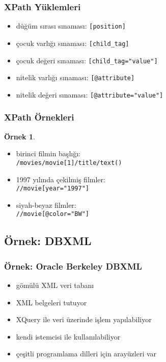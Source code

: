 \documentclass[dvipsnames]{beamer}
\theoremstyle{definition}
\theoremstyle{example}
\newtheorem{ornek}[theorem]{Örnek}
\theoremstyle{plain}
\begin{document}
\begin{frame}
  \frametitle{XPath Yüklemleri}

  \begin{itemize}
    \item düğüm sırası sınaması: \lstinline![position]!

    \pause
    \medskip
    \item çocuk varlığı sınaması: \lstinline![child_tag]!
    \item çocuk değeri sınaması: \lstinline![child_tag="value"]!

    \pause
    \medskip
    \item nitelik varlığı sınaması: \lstinline![@attribute]!
    \item nitelik değeri sınaması: \lstinline![@attribute="value"]!
  \end{itemize}
\end{frame}

\begin{frame}
  \frametitle{XPath Örnekleri}

  \begin{ornek}
    \begin{itemize}
      \item birinci filmin başlığı:\\
        \lstinline!/movies/movie[1]/title/text()!

      \pause
      \item 1997 yılında çekilmiş filmler:\\
        \lstinline!//movie[year="1997"]!

      \pause
      \item siyah-beyaz filmler:\\
        \lstinline!//movie[@color="BW"]!
    \end{itemize}
  \end{ornek}
\end{frame}

\subsection{Örnek: DBXML}

\begin{frame}
  \frametitle{Örnek: Oracle Berkeley DBXML}

  \begin{itemize}
    \item gömülü XML veri tabanı
    \item XML belgeleri tutuyor
    \item XQuery ile veri üzerinde işlem yapılabiliyor
    \item kendi istemcisi ile kullanılabiliyor
    \item çeşitli programlama dilleri için arayüzleri var
  \end{itemize}
\end{frame}
\end{document}
